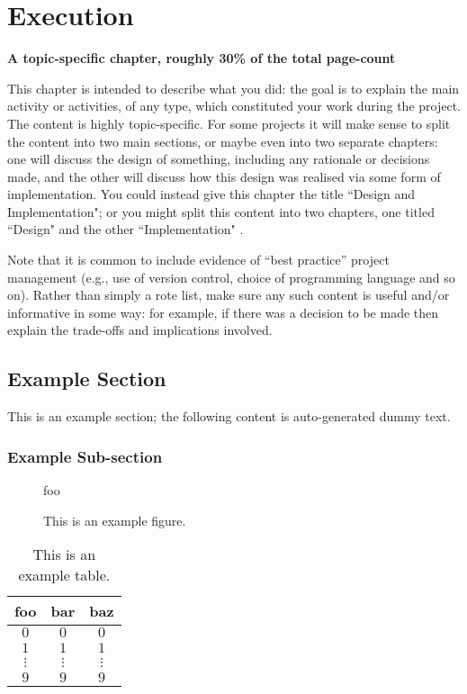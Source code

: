 \documentclass[ %
                    author={James Stephenson},
                supervisor={Dr. Edwin Simpson},
                    degree={MSc},
                     title={Bayesian Deep Learning For Extractive Test Summarisation},
                  subtitle={},
                      type={},
                      year={2023}]{dissertation}
\begin{document}
	
	\chapter{Execution}
	\label{chap:execution}
	
		{\bf A topic-specific chapter, roughly 30\% of the total page-count}
		\vspace{1cm} 
		
		\noindent
		This chapter is intended to describe what you did: the goal is to explain
		the main activity or activities, of any type, which constituted your work 
		during the project.  The content is highly topic-specific. For some 
		projects it will make sense to split the content into two main sections, or maybe even into two separate chapters: one 
		will discuss the design of something, including any rationale or decisions made, 
		and the other will discuss how this design was realised via some form of 
		implementation.  You could instead give this chapter the title ``Design and Implementation"; or you might split this content into two chapters, one titled ``Design" and the other ``Implementation" .
		
		Note that it is common to include evidence of ``best practice'' project 
		management (e.g., use of version control, choice of programming language 
		and so on).  Rather than simply a rote list, make sure any such content 
		is useful and/or informative in some way: for example, if there was a 
		decision to be made then explain the trade-offs and implications 
		involved.
		
		\section{Example Section}
		
			This is an example section; 
			the following content is auto-generated dummy text.
			\lipsum
			
			\subsection{Example Sub-section}
			
				\begin{figure}[t]
					\centering
					foo
					\caption{This is an example figure.}
					\label{fig}
				\end{figure}
				
				\begin{table}[t]
					\centering
					\begin{tabular}{|cc|c|}
						\hline
						foo      & bar      & baz      \\
						\hline
						$0     $ & $0     $ & $0     $ \\
						$1     $ & $1     $ & $1     $ \\
						$\vdots$ & $\vdots$ & $\vdots$ \\
						$9     $ & $9     $ & $9     $ \\
						\hline
					\end{tabular}
					\caption{This is an example table.}
					\label{tab}
				\end{table}
				
\end{document}
